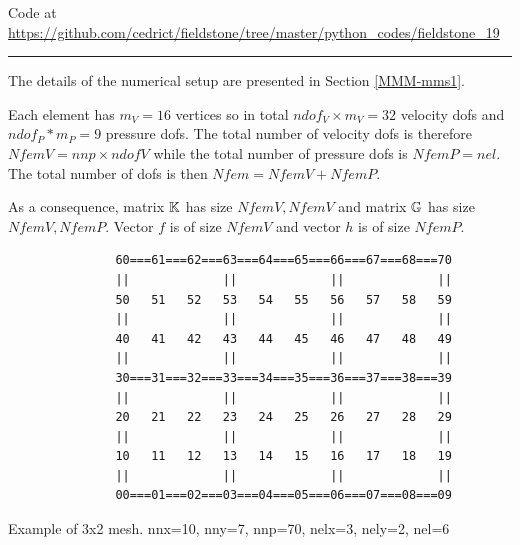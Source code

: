 

\begin{center}
Code at \url{https://github.com/cedrict/fieldstone/tree/master/python_codes/fieldstone_19}
\end{center}

\par\noindent\rule{\textwidth}{0.4pt}


The details of the numerical setup are presented in Section \ref{MMM-mms1}.

Each element has $m_V=16$ vertices so in total $ndof_V\times m_V=32$ 
velocity dofs and 
$ndof_P*m_P=9$ pressure dofs. The total number of 
velocity dofs is therefore $NfemV=nnp \times ndofV$ while the total number of
pressure dofs is $NfemP=nel$. The total number of dofs is then $Nfem=NfemV+NfemP$.

As a consequence, matrix ${\mathbb{K}}$ has size $NfemV,NfemV$ and matrix ${\mathbb{G}}$ has size $NfemV,NfemP$.
Vector $f$ is of size $NfemV$ and vector $h$ is of size $NfemP$.  

\begin{center}
\begin{verbatim}
               60===61===62===63===64===65===66===67===68===70
               ||             ||             ||             ||
               50   51   52   53   54   55   56   57   58   59
               ||             ||             ||             ||
               40   41   42   43   44   45   46   47   48   49
               ||             ||             ||             ||
               30===31===32===33===34===35===36===37===38===39
               ||             ||             ||             ||
               20   21   22   23   24   25   26   27   28   29
               ||             ||             ||             ||
               10   11   12   13   14   15   16   17   18   19
               ||             ||             ||             ||
               00===01===02===03===04===05===06===07===08===09
\end{verbatim}
{\captionfont Example of 3x2 mesh. nnx=10, nny=7, nnp=70, nelx=3, nely=2, nel=6}
\end{center}


